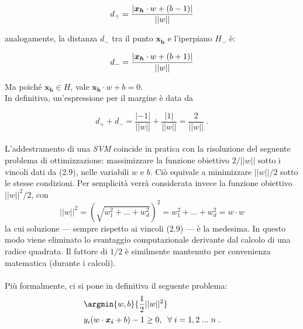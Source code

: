 \begin{equation}
	d_+ = \frac{| \boldsymbol{x_h} \cdot w + (b - 1) |}{||w||}
	\vspace{2mm}
\end{equation}

analogamente, la distanza $d_-$ tra il punto $\boldsymbol{x_h}$ e l'iperpiano $H_-$ è:

\begin{equation}
	d_- = \frac{| \boldsymbol{x_h} \cdot w + (b + 1) |}{||w||}
	\vspace{2mm}
\end{equation}


Ma poiché $\boldsymbol{x_h} \in H$, vale $\boldsymbol{x_h} \cdot w + b = 0$.
\\ In definitiva, un'espressione per il margine è data da

\begin{equation}
	d_+ + d_- = \frac{|-1|}{||w||} + \frac{|1|}{||w||} = \frac{2}{||w||} \; .
\end{equation}

\paragraph{}

L'addestramento di una \textit{SVM} coincide in pratica con la risoluzione del seguente problema di ottimizzazione: massimizzare la funzione obiettivo $2 / ||w||$ sotto i vincoli dati da (2.9), nelle variabili $w$ e $b$. Ciò equivale a minimizzare $||w|| / 2$ sotto le stesse condizioni. Per semplicità verrà considerata invece la funzione obiettivo $||w||^2 / 2$, con
\begin{equation}
	||w||^2 = \left( \sqrt{w_1^2 + ... + w_d^2} \right)^2 = w_1^2 + ... + w_d^2 = w \cdot w
\end{equation}
la cui soluzione --- sempre rispetto ai vincoli (2.9) --- è la medesima. In questo modo viene eliminato lo svantaggio computazionale derivante dal calcolo di una radice quadrata. Il fattore di $1 / 2$ è similmente mantenuto per convenienza matematica (durante i calcoli).

\paragraph{}
Più formalmente, ci si pone in definitiva il seguente problema:
\begin{equation}	
\begin{split}
	&\argmin {w, b} { \frac{1}{2} ||w||^2 }
	\\ &y_i(w \cdot \boldsymbol{x_i} + b) -1 \geq 0, \;\; \forall \; i = 1, 2 \;...\; n \;.
\end{split}
\end{equation}

